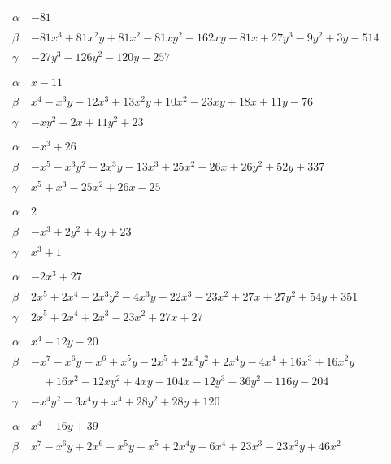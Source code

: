 \documentclass[11pt]{article}
\begin{document}
\begin{longtable}{@{}ll@{}}
$\alpha$ & $-81$\\
$\beta$ & $-81x^{3}+81x^{2}y+81x^{2}-81xy^{2}-162xy-81x+27y^{3}-9y^{2}+3y-514$\\
$\gamma$ & $-27y^{3}-126y^{2}-120y-257$\\
\addlinespace[3pt]
\multicolumn{2}{@{}l}{$\{i,j\}=\{31,42\}$, $k_{ij}=2^{3}\cdot 11$}\\
$\alpha$ & $x-11$\\
$\beta$ & $x^{4}-x^{3}y-12x^{3}+13x^{2}y+10x^{2}-23xy+18x+11y-76$\\
$\gamma$ & $-xy^{2}-2x+11y^{2}+23$\\
\addlinespace[3pt]
\multicolumn{2}{@{}l}{$\{i,j\}=\{33,13\}$, $k_{ij}=3^{3}\cdot 5^{2}$}\\
$\alpha$ & $-x^{3}+26$\\
$\beta$ & $-x^{5}-x^{3}y^{2}-2x^{3}y-13x^{3}+25x^{2}-26x+26y^{2}+52y+337$\\
$\gamma$ & $x^{5}+x^{3}-25x^{2}+26x-25$\\
\addlinespace[3pt]
\multicolumn{2}{@{}l}{$\{i,j\}=\{33,37\}$, $k_{ij}=2\cdot 5^{2}$}\\
$\alpha$ & $2$\\
$\beta$ & $-x^{3}+2y^{2}+4y+23$\\
$\gamma$ & $x^{3}+1$\\
\addlinespace[3pt]
\multicolumn{2}{@{}l}{$\{i,j\}=\{33,43\}$, $k_{ij}=3^{3}\cdot 5^{2}$}\\
$\alpha$ & $-2x^{3}+27$\\
$\beta$ & $2x^{5}+2x^{4}-2x^{3}y^{2}-4x^{3}y-22x^{3}-23x^{2}+27x+27y^{2}+54y+351$\\
$\gamma$ & $2x^{5}+2x^{4}+2x^{3}-23x^{2}+27x+27$\\
\addlinespace[3pt]
\multicolumn{2}{@{}l}{$\{i,j\}=\{34,23\}$, $k_{ij}=2^{6}$}\\
$\alpha$ & $x^{4}-12y-20$\\
$\beta$ & $-x^{7}-x^{6}y-x^{6}+x^{5}y-2x^{5}+2x^{4}y^{2}+2x^{4}y-4x^{4}+16x^{3}+16x^{2}y$\\
 & $\quad +16x^{2}-12xy^{2}+4xy-104x-12y^{3}-36y^{2}-116y-204$\\
$\gamma$ & $-x^{4}y^{2}-3x^{4}y+x^{4}+28y^{2}+28y+120$\\
\addlinespace[3pt]
\multicolumn{2}{@{}l}{$\{i,j\}=\{35,18\}$, $k_{ij}=2^{10}$}\\
$\alpha$ & $x^{4}-16y+39$\\
$\beta$ & $x^{7}-x^{6}y+2x^{6}-x^{5}y-x^{5}+2x^{4}y-6x^{4}+23x^{3}-23x^{2}y+46x^{2}$\\

\end{longtable}
\end{document}
